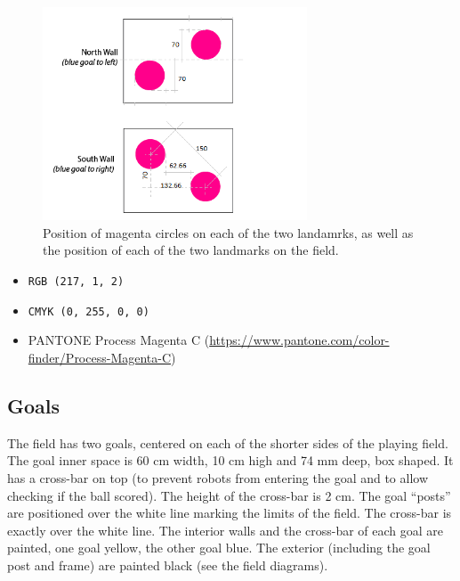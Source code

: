 \documentclass{article}
\begin{document}
\begin{figure}[H]
    \centering
    \includegraphics[width=0.7\textwidth]{media/landmarks_blueprint.png}
    \caption{Position of magenta circles on each of the two landamrks, as well
        as the position of each of the two landmarks on the field.}
    \label{fig:landmarks_blueprint}
\end{figure}


\begin{itemize}
    \item \texttt{RGB (217, 1, 2)}
    \item \texttt{CMYK (0, 255, 0, 0)}
    \item PANTONE Process Magenta C (\url{https://www.pantone.com/color-finder/Process-Magenta-C})
\end{itemize}

\subsection{ Goals \label{ref-032}}

The field has two goals, centered on each of the shorter sides of the playing
field. The goal inner space is 60 cm width, 10 cm high and 74 mm deep, box
shaped. It has a cross-bar on top (to prevent robots from entering the goal and
to allow checking if the ball scored). The height of the cross-bar is 2 cm. The
goal ``posts'' are positioned over the white line marking the limits of the
field. The cross-bar is exactly over the white line. The interior walls and the
cross-bar of each goal are painted, one goal yellow, the other goal blue. The
exterior (including the goal post and frame) are painted black (see the field
diagrams).
\end{document}
